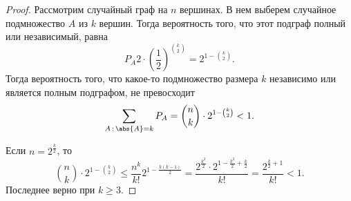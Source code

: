  \begin{proof}
     Рассмотрим случайный граф на $n$ вершинах. В нем выберем случайное подмножество $A$ из $k$ вершин. Тогда вероятность того, что этот подграф полный или независимый, равна
     $$P_A 2\cdot (\frac{1}{2})^{\binom{k}{2}} = 2^{1 - \binom{k}{2}}.$$
     Тогда вероятность того, что какое-то подмножество размера $k$ независимо или является полным подграфом, не превосходит
     $$\sum_{A \,:\, \abs{A} = k}P_A =
         \binom{n}{k}\cdot 2^{1 - \binom{k}{2}} \underset{}{<} 1.$$
         
     Если $n = 2^{\frac{k}{2}}$, то 
     $$\binom{n}{k}\cdot 2^{1 - \binom{k}{2}} \le \frac{n^k}{k!}2^{1 - \frac{k(k-1)}{2}} = \frac{2^{\frac{k^2}{2}}\cdot2^{1 - \frac{k^2}{2} +
                 \frac{k}{2}}}{k!} = \frac{2^{\frac{k}{2} + 1}}{k!} < 1.$$
    Последнее верно при $k \ge 3.$
 \end{proof}


